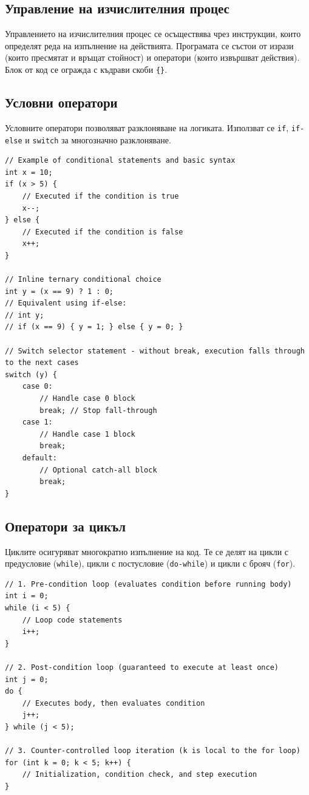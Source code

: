 \documentclass{scrartcl}
\begin{document}
\begin{FlushLeft}
\section{Управление на изчислителния процес}
Управлението на изчислителния процес се осъществява чрез инструкции, които определят реда на изпълнение на действията. Програмата се състои от изрази (които пресмятат и връщат стойност) и оператори (които извършват действия). Блок от код се огражда с къдрави скоби \texttt{\{\}}.

\subsection{Условни оператори}
Условните оператори позволяват разклоняване на логиката. Използват се \texttt{if}, \texttt{if-else} и \texttt{switch} за многозначно разклоняване.
\begin{lstlisting}
// Example of conditional statements and basic syntax
int x = 10;
if (x > 5) {
    // Executed if the condition is true
    x--;
} else {
    // Executed if the condition is false
    x++;
}

// Inline ternary conditional choice
int y = (x == 9) ? 1 : 0; 
// Equivalent using if-else:
// int y;
// if (x == 9) { y = 1; } else { y = 0; }

// Switch selector statement - without break, execution falls through to the next cases
switch (y) {
    case 0:
        // Handle case 0 block
        break; // Stop fall-through
    case 1:
        // Handle case 1 block
        break;
    default:
        // Optional catch-all block
        break;
}
\end{lstlisting}

\subsection{Оператори за цикъл}
Циклите осигуряват многократно изпълнение на код. Те се делят на цикли с предусловие (\texttt{while}), цикли с постусловие (\texttt{do-while}) и цикли с брояч (\texttt{for}).
\begin{lstlisting}
// 1. Pre-condition loop (evaluates condition before running body)
int i = 0;
while (i < 5) {
    // Loop code statements
    i++;
}

// 2. Post-condition loop (guaranteed to execute at least once)
int j = 0;
do {
    // Executes body, then evaluates condition
    j++;
} while (j < 5);

// 3. Counter-controlled loop iteration (k is local to the for loop)
for (int k = 0; k < 5; k++) {
    // Initialization, condition check, and step execution
}


\end{lstlisting}
\end{FlushLeft}
\end{document}
